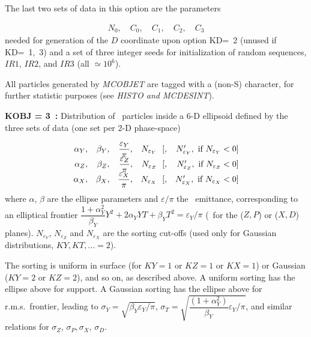 \noindent The last two sets of data in this option are the parameters 

 \begin{gather*}
	N_0,\quad C_0,\quad C_1,\quad C_2,\quad C_3 
 \end{gather*}
%
 needed for generation of the $ D $ coordinate upon option \mbox{KD=  2}  
(unused if \mbox{KD= 1, 3}) and a set of three integer seeds for initialization 
of random sequences, $ IR1$,   $ IR2$,   and $ IR3$ (all $\simeq 10^6 $).


\noindent All particles generated by \textsl{MCOBJET}  are tagged with  
a (non-S) character, for further statistic purposes (see \textsl{HISTO \textrm{and}  
MCDESINT}).  

\medskip

\noindent\textbf{KOBJ  = 3~:} Distribution of \IMAX\ particles inside a
6-D ellipsoid defined by the three sets of data (one set per 
 2-D phase-space)

$$
\begin{array}{*{4}{r<{,}}r}
 \alpha_ Y  &   \beta_ Y  
            &  \dfrac{ \varepsilon_Y}{\pi} 
            &  N_{\varepsilon_ Y}  ~~[
            & N'_{\varepsilon_ Y}, \text{ if } N_{\varepsilon_ Y} < 0] \\
\alpha_ Z   &  \beta_ Z  
            &  \dfrac{ \varepsilon_Z }{ \pi} 
            & N_{\varepsilon_ Z} ~~[
            & N'_{\varepsilon_ Z}, \text{ if } N_{\varepsilon_ Z} < 0] \\
\alpha_ X   & \beta_ X 
            &  \dfrac{\varepsilon_X }{ \pi} 
            & N_{\varepsilon_ X} ~~[
            & N'_{\varepsilon_ X}, \text{ if } N_{\varepsilon_ X} < 0] 
\end{array}           
$$            
%
where $\alpha$, $\beta$ are the ellipse parameters and $\varepsilon/ 
\pi$ the \rms\ emittance, corresponding to an elliptical  frontier 
$\dfrac{1 + \alpha^2_Y}{\beta_Y} Y^2 + 2 \alpha_Y YT + \beta_Y T^2 = 
\varepsilon_Y / \pi$ (\id\ for the ($Z, P$) 
or ($X, D$) planes). $N_{\varepsilon_ Y}$, $N_{\varepsilon_ Z}$ and 
$N_{\varepsilon_ X}$ are the sorting cut-offs (used only for Gaussian 
distributions, $KY, KT, ...=2$).

\noindent The sorting is uniform in surface (for $KY=1$ or $KZ=1$ 
or $KX=1$) or Gaussian ($KY=2$ or $KZ=2$), and so on, as described 
above. A uniform sorting has the ellipse above for support. A 
Gaussian sorting has the ellipse above for r.m.s.~frontier, leading 
to $\sigma_Y = \sqrt {\beta_Y \varepsilon_Y / \pi}$, 
$\sigma_T = \sqrt {\dfrac{(1+\alpha_Y^2)}{\beta_Y} \varepsilon_Y / \pi}$, 
and similar relations for $\sigma_Z$, $\sigma_P, \sigma_X$, $\sigma_D$.

